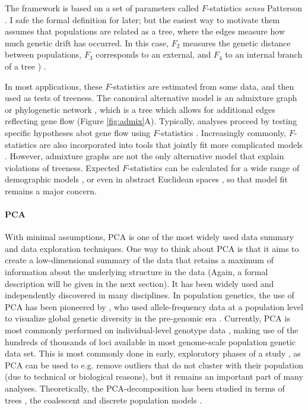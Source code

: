 \documentclass[12pt,fullpage, a4paper]{article}
\begin{document}
The framework is based on a set of parameters called  $F$-statistics \textit{sensu} Patterson \citep{reich2009, patterson2012, peter2016}. I safe the formal definition for later; but the easiest way to motivate them assumes that populations are related as a tree, where the edges measure how much genetic drift has occurred. In this case, $F_2$ measures the genetic distance between populations, $F_3$ corresponds to an external, and $F_4$ to an internal branch of a tree ) \citep[Figure \ref{fig:geom};][]{semple2003, peter2016}.

In most applications, these $F$-statistics are estimated from some data, and then used as tests of treeness. The canonical alternative model is an admixture graph or phylogenetic network \citep{patterson2012}, which is a tree which allows for additional edges reflecting gene flow (Figure \ref{fig:admix}A). Typically, analyses proceed by testing specific hypotheses abot gene flow using $F$-statistics \citep{reich2009, green2010, lazaridis2014}. Increasingly commonly, $F$-statistics are also incorporated into tools that jointly fit more complicated models \citep[e.g. ][]{patterson2012,harney2021}. However, admixture graphs are not the only alternative model that explain violations of treeness. Expected $F$-statistics can be calculated for a wide range of demographic models \citep{peter2016}, or even in abstract Euclidean spaces \citep{oteo-garcia2021}, so that model fit remains a major concern.

\paragraph{PCA}
With minimal assumptions, PCA is one of the most widely used data summary and data exploration techniques. One way to think about PCA is that it aims to create a low-dimensional summary of the data that retains a maximum of information about the underlying structure in the data (Again, a formal description will be given in the next section). It has been widely used and independently discovered in many disciplines. In population genetics, the use of PCA has been pioneered by \cite{cavalli-sforza1964}, who used allele-frequency data at a population level to visualize global genetic diversity in the pre-genomic era \citep{cavalli-sforza1994}. Currently, PCA is most commonly performed on individual-level genotype data \citep[e.g.][]{patterson2006, novembre2008}, making use of the hundreds of thousands of loci available in most genome-scale population genetic data set.  This is most commonly done in early, exploratory phases of a study \citep{schraiber2015}, as PCA can be used to e.g. remove outliers that do not cluster with their population (due to technical or biological reasons), but it remains an important part of many analyses. Theoretically, the PCA-decomposition has been studied in terms of trees \citep{cavalli-sforza1975}, the coalescent \citep{mcvean2009} and discrete population models \citep{francois2021}.
\end{document}
